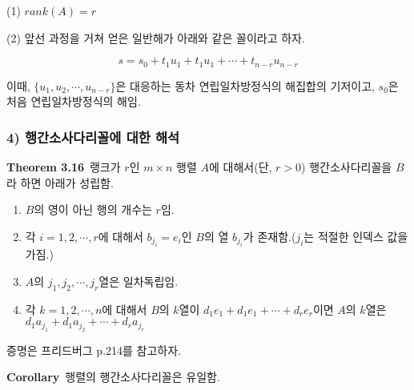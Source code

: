(1) $rank(A)=r$

(2) 앞선 과정을 거쳐 얻은 일반해가 아래와 같은 꼴이라고 하자.

\[
s=s_0+t_1u_1+t_1u_1+ \cdots + t_{n-r}u_{n-r}
\]

이때, $\{u_1,u_2, \cdots ,u_{n-r}\}$은 대응하는 동차 연립일차방정식의 해집합의 기저이고, $s_0$은 처음 연립일차방정식의 해임.

\subsubsection*{4) 행간소사다리꼴에 대한 해석}
\textbf{Theorem 3.16}\, 랭크가 $r$인 $m \times n$ 행렬 $A$에 대해서(단, $r>0$) 행간소사다리꼴을 $B$라 하면 아래가 성립함.

\begin{enumerate}
    \item $B$의 영이 아닌 행의 개수는 $r$임.
    \item 각 $i=1,2, \cdots ,r$에 대해서 $b_{j_i}=e_i$인 $B$의 열 $b_{j_i}$가 존재함.($j_i$는 적절한 인덱스 값을 가짐.)
    \item $A$의 $j_1,j_2, \cdots ,j_r$열은 일차독립임.
    \item 각 $k=1,2, \cdots ,n$에 대해서 $B$의 $k$열이 $d_1e_1+d_1e_1+ \cdots +d_re_r$이면 $A$의 $k$열은 $d_1a_{j_1}+d_1a_{j_2}+ \cdots +d_ra_{j_r}$
\end{enumerate}

증명은 프리드버그 p.214를 참고하자.

\textbf{Corollary}\, 행렬의 행간소사다리꼴은 유일함.


\newpage
